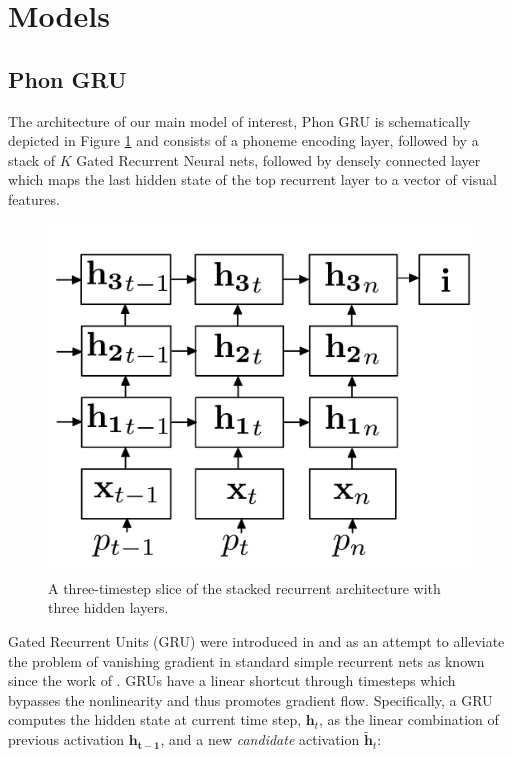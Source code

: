 \section{Models}
\label{sec:models}

\subsection{Phon GRU}
The architecture of our main model of interest, {\sc Phon GRU} is
schematically depicted in Figure \ref{fig:architecture} and consists of a phoneme
encoding  layer, followed by a stack of $K$ Gated Recurrent Neural
nets, followed by densely connected layer which maps the last hidden
state of the top recurrent layer to a vector of visual features.

\begin{figure}
  \centering
  \includegraphics[scale=0.2]{architecture.pdf}
  \caption{A three-timestep slice of the stacked recurrent architecture with three hidden layers.}
  \label{fig:architecture}
\end{figure}

Gated Recurrent Units (GRU) were introduced in
 and  as an
attempt to alleviate the problem of vanishing gradient in standard
simple recurrent nets as known since the work of
. GRUs have a linear shortcut through
timesteps which bypasses the nonlinearity and thus promotes gradient
flow.
Specifically, a GRU computes the hidden state at current time step, $\mathbf{h}_{t}$, as the
linear combination of previous activation $\mathbf{h_{t-1}}$, and a new
{\it candidate} activation $\mathbf{\tilde{h}}_t$:
%

